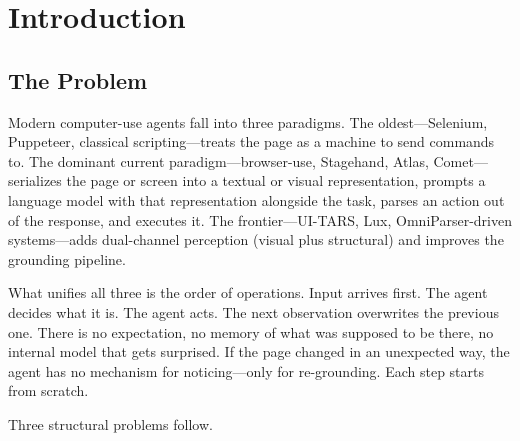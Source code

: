 \documentclass[12pt]{article}
\theoremstyle{definition}
\theoremstyle{remark}
\newcommand{\grp}{\textsc{grp}}
\begin{document}
\begin{abstract}
This paper specifies the architecture, names the two modes of
imagination, situates \grp{} against the prior work in world models
and predictive processing, and surfaces the open questions whose
resolution will determine which contributions are paper-citable
architecture and which remain useful framing. Implementation has not
started; the architecture is the artifact at this stage. Four
falsification predictions are stated sharply enough to be checked
once implementation begins (Section~\ref{sec:falsification}).
\end{abstract}

\section{Introduction}
\label{sec:intro}

\subsection{The Problem}
\label{subsec:problem}

Modern computer-use agents fall into three paradigms. The oldest---Selenium,
Puppeteer, classical scripting---treats the page as a machine to send
commands to. The dominant current paradigm---browser-use, Stagehand, Atlas,
Comet---serializes the page or screen into a textual or visual representation,
prompts a language model with that representation alongside the task,
parses an action out of the response, and executes it. The frontier---UI-TARS,
Lux, OmniParser-driven systems---adds dual-channel perception (visual plus
structural) and improves the grounding pipeline.

What unifies all three is the order of operations. Input arrives first.
The agent decides what it is. The agent acts. The next observation
overwrites the previous one. There is no expectation, no memory of what
was supposed to be there, no internal model that gets surprised. If the
page changed in an unexpected way, the agent has no mechanism for
noticing---only for re-grounding. Each step starts from scratch.

Three structural problems follow.
\end{document}
